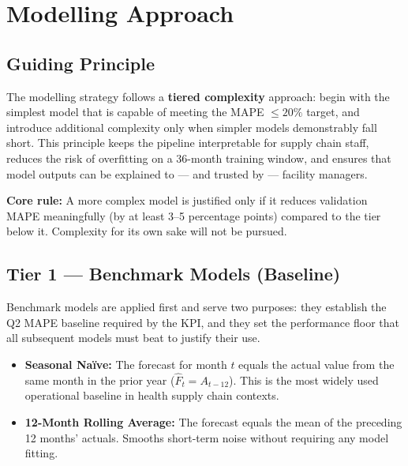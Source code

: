 \documentclass[12pt, a4paper]{article}
\begin{document}
\section{Modelling Approach}

\subsection{Guiding Principle}

The modelling strategy follows a \textbf{tiered complexity} approach: begin
with the simplest model that is capable of meeting the MAPE $\leq 20\%$
target, and introduce additional complexity only when simpler models
demonstrably fall short. This principle keeps the pipeline interpretable for
supply chain staff, reduces the risk of overfitting on a 36-month training
window, and ensures that model outputs can be explained to --- and trusted by
--- facility managers.

\begin{mdframed}[style=notebox]
\textbf{Core rule:} A more complex model is justified only if it reduces
validation MAPE meaningfully (by at least 3--5 percentage points) compared to
the tier below it. Complexity for its own sake will not be pursued.
\end{mdframed}

\vspace{0.8em}

\subsection{Tier 1 --- Benchmark Models (Baseline)}

Benchmark models are applied first and serve two purposes: they establish the
Q2 MAPE baseline required by the KPI, and they set the performance floor that
all subsequent models must beat to justify their use.

\begin{itemize}[leftmargin=1.5em, itemsep=4pt]
  \item \textbf{Seasonal Na\"{i}ve:} The forecast for month $t$ equals the
        actual value from the same month in the prior year
        ($\hat{F}_t = A_{t-12}$). This is the most widely used operational
        baseline in health supply chain contexts.

  \item \textbf{12-Month Rolling Average:} The forecast equals the mean of
        the preceding 12 months' actuals. Smooths short-term noise without
        requiring any model fitting.
\end{itemize}
\end{document}

